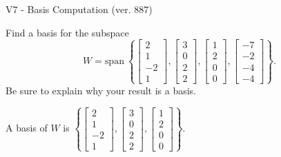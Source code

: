 \begin{exercise}
  \begin{exerciseTitle}V7 - Basis Computation (ver. 887)\end{exerciseTitle}
  \begin{exerciseStatement}
    Find a basis for the subspace 
\[W=\mathrm{span}\ \left\{\left[\begin{array}{r}
2 \\
1 \\
-2 \\
1
\end{array}\right] , \left[\begin{array}{r}
3 \\
0 \\
2 \\
2
\end{array}\right] , \left[\begin{array}{r}
1 \\
2 \\
0 \\
0
\end{array}\right] , \left[\begin{array}{r}
-7 \\
-2 \\
-4 \\
-4
\end{array}\right]\right\}.\]
 Be sure to explain why your result is a basis.


  \end{exerciseStatement}
  \begin{exerciseAnswer}
   A basis of \(W\) is  \(\left\{\left[\begin{array}{r}
2 \\
1 \\
-2 \\
1
\end{array}\right] , \left[\begin{array}{r}
3 \\
0 \\
2 \\
2
\end{array}\right] , \left[\begin{array}{r}
1 \\
2 \\
0 \\
0
\end{array}\right]\right\}\).
  


  \end{exerciseAnswer}
\end{exercise}